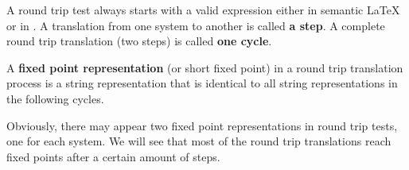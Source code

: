 A round trip test always starts with a valid expression either in semantic \LaTeX{} or in \Maple. A translation from one system to another is called \textbf{a step}. A complete round trip translation (two steps) is called \textbf{one cycle}.

\begin{definition}
A \textbf{fixed point representation} (or short fixed point) in a round trip translation process is a string representation that is identical to all string representations in the following cycles.
\end{definition}

Obviously, there may appear two fixed point representations in round trip tests, one for each system. We will see that most of the round trip translations reach fixed points after a certain amount of steps.

